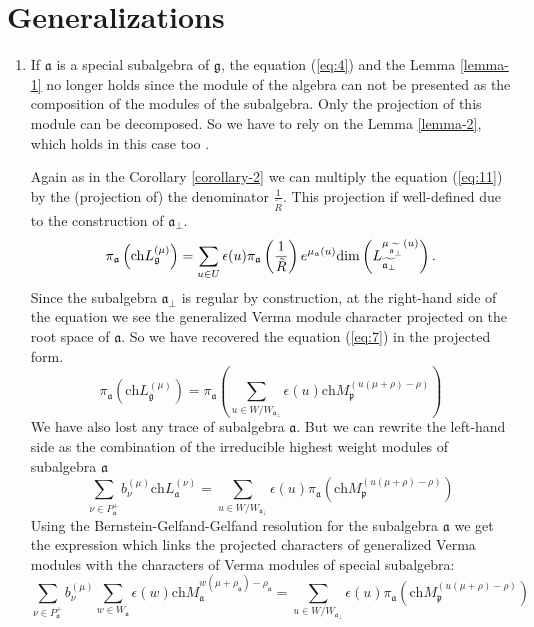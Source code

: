 \documentclass[12pt]{article}
\theoremstyle{definition}
\newcommand{\gf}{\mathfrak{g}}
\newcommand{\af}{\mathfrak{a}}
\newcommand{\afb}{\mathfrak{a}_{\bot}}
\newcommand{\pf}{\mathfrak{p}}
\begin{document}
\section{Generalizations}
\label{sec:generalizations}

\begin{enumerate}
\item If $\af$ is a special subalgebra of $\gf$, the equation (\ref{eq:4}) and the Lemma \ref{lemma-1} no longer holds since the module of the algebra can not be presented as the composition of the modules of the subalgebra. Only the projection of this module can be decomposed. So we have to rely on the Lemma \ref{lemma-2}, which holds in this case too \cite{2010arXiv1007.0318L}.

Again as in the Corollary \ref{corollary-2} we can multiply the equation (\ref{eq:11}) by the (projection of) the denominator $\frac{1}{\tilde R}$. This projection if well-defined due to the construction of $\afb$.
\begin{equation}
  \label{eq:12}
  \pi_{\af}\left(\mathrm{ch} L^{(\mu)}_{\gf}\right)= \sum_{u\in U}\epsilon(u) \pi_{\af}\left(\frac{1}{\tilde R}\right) e^{\mu_{\af}(u)}\mathrm{dim} \left( L_{\widetilde{\af_{\perp }}}^{\mu _{%
\widetilde{\af_{\perp }}}\left( u\right) }\right) .
\end{equation}
Since the subalgebra $\afb$ is regular by construction,  at the right-hand side of the equation we see the generalized Verma module character projected on the root space of $\af$. So we have recovered the equation (\ref{eq:7}) in the projected form.
\begin{equation}
  \label{eq:13}
   \pi_{\af}\left(\mathrm{ch} L^{(\mu)}_{\gf}\right)= \pi_{\af}\left(  \sum_{u \in W/W_{\afb}} \epsilon(u) \mathrm{ch} M^{(u(\mu+\rho)-\rho)}_{\pf}\right)
\end{equation}
We have also lost any trace of subalgebra $\af$. But we can rewrite the left-hand side as the combination of the irreducible highest weight modules of subalgebra $\af$
\begin{equation}
  \label{eq:14}
  \sum_{\nu\in P^{+}_{\af}} b^{(\mu)}_{\nu} \mathrm{ch} L^{(\nu)}_{\af}= \sum_{u \in W/W_{\afb}} \epsilon(u) \pi_{\af}\left(   \mathrm{ch} M^{(u(\mu+\rho)-\rho)}_{\pf}\right)
\end{equation}
Using the Bernstein-Gelfand-Gelfand resolution for the subalgebra $\af$ we get the expression which links the projected characters of generalized Verma modules with the characters of Verma modules of special subalgebra:
\begin{equation}
  \label{eq:15}
  \sum_{\nu\in P^+_{\af}}b^{(\mu)}_{\nu}\sum_{ w\in W_{\af}} \epsilon(w) \mathrm{ch} M_{\af}^{w(\mu+\rho_{\af})-\rho_{\af}} =  \sum_{u \in W/W_{\afb}} \epsilon(u) \pi_{\af}\left(   \mathrm{ch} M^{(u(\mu+\rho)-\rho)}_{\pf}\right)
\end{equation}


\end{enumerate}
\end{document}
